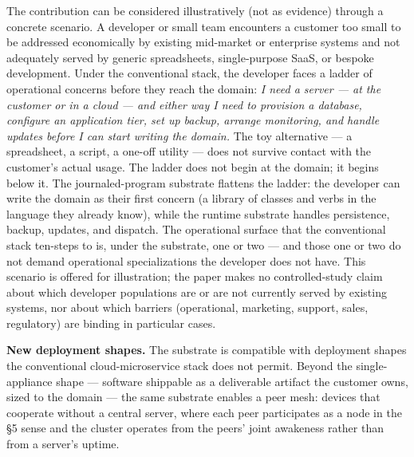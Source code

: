 \documentclass[
]{article}
\begin{document}
The contribution can be considered illustratively (not as evidence)
through a concrete scenario. A developer or small team encounters a
customer too small to be addressed economically by existing mid-market
or enterprise systems and not adequately served by generic spreadsheets,
single-purpose SaaS, or bespoke development. Under the conventional
stack, the developer faces a ladder of operational concerns before they
reach the domain: \emph{I need a server --- at the customer or in a
cloud --- and either way I need to provision a database, configure an
application tier, set up backup, arrange monitoring, and handle updates
before I can start writing the domain.} The toy alternative --- a
spreadsheet, a script, a one-off utility --- does not survive contact
with the customer's actual usage. The ladder does not begin at the
domain; it begins below it. The journaled-program substrate flattens the
ladder: the developer can write the domain as their first concern (a
library of classes and verbs in the language they already know), while
the runtime substrate handles persistence, backup, updates, and
dispatch. The operational surface that the conventional stack ten-steps
to is, under the substrate, one or two --- and those one or two do not
demand operational specializations the developer does not have. This
scenario is offered for illustration; the paper makes no
controlled-study claim about which developer populations are or are not
currently served by existing systems, nor about which barriers
(operational, marketing, support, sales, regulatory) are binding in
particular cases.

\textbf{New deployment shapes.} The substrate is compatible with
deployment shapes the conventional cloud-microservice stack does not
permit. Beyond the single-appliance shape --- software shippable as a
deliverable artifact the customer owns, sized to the domain --- the same
substrate enables a peer mesh: devices that cooperate without a central
server, where each peer participates as a node in the §5 sense and the
cluster operates from the peers' joint awakeness rather than from a
server's uptime.
\end{document}
